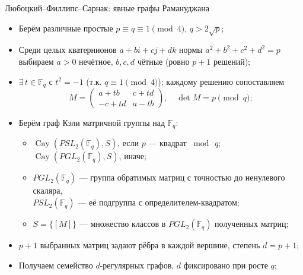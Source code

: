 \documentclass[serif, aspectratio=169]{beamer}
\begin{document}
\begin{frame}{Любоцкий--Филлипс--Сарнак: явные графы Рамануджана}
    \begin{itemize}
        \item Берём различные простые $p\equiv q\equiv1\pmod4$, $q>2\sqrt p$;
        \item Среди целых кватернионов $a+bi+cj+dk$ нормы $a^2+b^2+c^2+d^2=p$ выбираем $a>0$ нечётное, $b,c,d$ чётные (ровно $p+1$ решений);
        \item $\exists\,t\in\mathbb{F}_q$ с $t^2=-1$ (т.к. $q\equiv1\pmod4$); каждому решению сопоставляем
        \[M=\begin{pmatrix}a+tb&c+td\\-c+td&a-tb\end{pmatrix},\quad \det M=p\pmod q;\]
        \item Берём граф Кэли матричной группы над $\mathbb F_q$:
        \begin{itemize}
            \item $\operatorname{Cay}(PSL_2(\mathbb F_q),S)$, если $p$ --- квадрат $\bmod\, q$; $\operatorname{Cay}(PGL_2(\mathbb F_q),S)$, иначе;
            \item $PGL_2(\mathbb F_q)$ --- группа обратимых матриц с точностью до ненулевого скаляра,\\ $PSL_2(\mathbb F_q)$ --- её подгруппа с определителем-квадратом;
            \item $S=\{[M]\}$ --- множество классов в $PGL_2(\mathbb F_q)$ полученных матриц;
        \end{itemize}
        \item $p+1$ выбранных матриц задают рёбра в каждой вершине, степень $d=p+1$;
        \item Получаем семейство $d$-регулярных графов, $d$ фиксировано при росте $q$;
    \end{itemize}
\end{frame}
\end{document}
